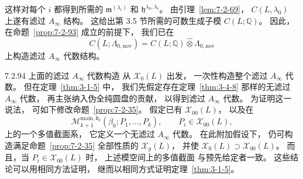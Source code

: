 这样对每个 $i$ 都得到所需的
$\mathfrak m^{(\lambda_i)}$
和 $\mathfrak h^{\lambda_0,\lambda_i}$。
由引理~\ref{lem:7-2-69}，
$C(L,\lambda_0)$ 上遂有滤过 $A_\infty$ 结构。
这给出第 3.5 节所需的可数生成子模
$C(L;\mathbb Q)$。
因此，在命题~\ref{prop:7-2-93} 成立的前提下，
我们已在
\[
C(L;\Lambda_{0,\mathrm{nov}})
=C(L;\mathbb Q)\widehat\otimes
\Lambda_{0,\mathrm{nov}}
\]
上构造滤过 $A_\infty$ 代数结构。

\begin{remark}{7.2.94}\label{rem:7-2-94}
上面的滤过 $A_\infty$ 代数构造
从 $\mathcal X_0(L)$ 出发，
一次性构造整个滤过 $A_\infty$ 代数。
但在定理~\ref{thm:3-1-5} 中，%
我们先假定存在定理~\ref{thm:3-4-8}
那样的无滤过 $A_\infty$ 代数，
再主张纳入伪全纯圆盘的贡献，
以得到滤过 $A_\infty$ 代数。
为证明这一说法，
可如下修改命题~\ref{prop:7-2-35}。
假定已有 $\mathcal X_{00}(L)$，
以及在
\[
\mathcal M^{\mathrm{main},\mathfrak d_0}_{k+1}
(\beta_0;P_1,\ldots,P_k),
\qquad P_i\in\mathcal X_{00}(L),
\]
上的一个多值截面系，
它定义一个无滤过 $A_\infty$ 代数。
在此附加假设下，
仍可构造满足命题~\ref{prop:7-2-35}
全部性质的 $\mathcal X_g(L)$，
并使 $\mathcal X_0(L)\supset\mathcal X_{00}(L)$。
而且，当 $P_i\in\mathcal X_{00}(L)$ 时，
上述模空间上的多值截面
与预先给定者一致。
这些结论可以用相同方法证明，
继而以相同方式证明定理~\ref{thm:3-1-5}。
\end{remark}
